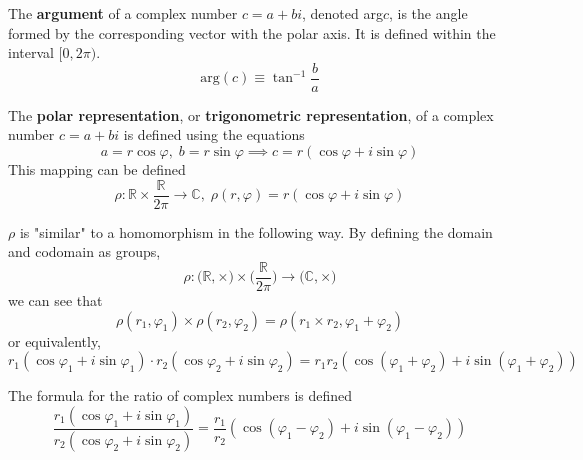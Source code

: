 \documentclass{article}
\begin{document}
      \begin{definition}
        The \textbf{argument} of a complex number $c = a + b i$, denoted arg$c$, is the angle formed by the corresponding vector with the polar axis. It is defined within the interval $[0, 2\pi)$. 
        \begin{equation}
          \text{arg}(c) \equiv \tan^{-1}{\frac{b}{a}}
        \end{equation}
      \end{definition}

      \begin{definition}
        The \textbf{polar representation}, or \textbf{trigonometric representation}, of a complex number $c = a + b i$ is defined using the equations 
        \begin{equation}
          a = r \cos{\varphi}, \; b = r\sin{\varphi} \implies c = r (\cos{\varphi} + i \sin{\varphi})
        \end{equation}
        This mapping can be defined 
        \begin{equation}
          \rho: \mathbb{R} \times \frac{\mathbb{R}}{2 \pi} \longrightarrow \mathbb{C}, \; \rho(r, \varphi) = r (\cos{\varphi} + i \sin{\varphi})
        \end{equation}
      \end{definition}

      \begin{theorem}
        $\rho$ is "similar" to a homomorphism in the following way. By defining the domain and codomain as groups, 
        \begin{equation}
          \rho: \big( \mathbb{R}, \times \big) \times \Big( \frac{\mathbb{R}}{2 \pi} \Big) \longrightarrow \big( \mathbb{C}, \times \big)
        \end{equation}
        we can see that
        \begin{equation}
          \rho (r_1, \varphi_1) \times \rho(r_2, \varphi_2) = \rho(r_1 \times r_2, \varphi_1 + \varphi_2) 
        \end{equation}
        or equivalently, 
        \begin{equation}
          r_1 (\cos{\varphi_1} + i \sin{\varphi_1}) \cdot r_2 (\cos{\varphi_2} + i \sin{\varphi_2}) = r_1 r_2 (\cos{(\varphi_1 + \varphi_2)} + i \sin{(\varphi_1 + \varphi_2)})
        \end{equation}
      \end{theorem}

      \begin{corollary}
        The formula for the ratio of complex numbers is defined
        \begin{equation}
          \frac{r_1 (\cos{\varphi_1} + i \sin{\varphi_1})}{r_2 (\cos{\varphi_2} + i \sin{\varphi_2})} = \frac{r_1}{r_2} (\cos{(\varphi_1 - \varphi_2)} + i \sin{(\varphi_1 - \varphi_2)})
        \end{equation}
      \end{corollary}
\end{document}
